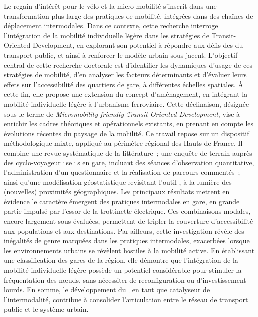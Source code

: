 {\footnotesize{Le regain d’intérêt pour le vélo et la micro-mobilité s’inscrit dans une transformation plus large des pratiques de mobilité, intégrées dans des chaînes de déplacement intermodales. Dans ce contexte, cette recherche interroge l’intégration de la mobilité individuelle légère dans les stratégies de Transit-Oriented Development, en explorant son potentiel à répondre aux défis des  du transport public, et ainsi à renforcer le modèle urbain sous-jacent. L’objectif central de cette recherche doctorale est d’identifier les dynamiques d’usage de ces stratégies de mobilité, d’en analyser les facteurs déterminants et d’évaluer leurs effets sur l’accessibilité des quartiers de gare, à différentes échelles spatiales. À cette fin, elle propose une extension du concept d’aménagement, en intégrant la mobilité individuelle légère à l'urbanisme ferroviaire. Cette déclinaison, désignée sous le terme de \textsl{Micromobility-friendly Transit-Oriented Development}, vise à enrichir les cadres théoriques et opérationnels existants, en prenant en compte les évolutions récentes du paysage de la mobilité. Ce travail repose sur un dispositif méthodologique mixte, appliqué au périmètre régional des Hauts-de-France. Il combine une revue systématique de la littérature~; une enquête de terrain auprès des cyclo-voyageur·se·s en gare, incluant des séances d’observation quantitative, l’administration d’un questionnaire et la réalisation de parcours commentés~; ainsi qu'une modélisation géostatistique revisitant l’outil , à la lumière des (nouvelles) proximités géographiques. Les principaux résultats mettent en évidence le caractère émergent des pratiques intermodales en gare, en grande partie impulsé par l’essor de la trottinette électrique. Ces combinaisons modales, encore largement sous-évaluées, permettent de tripler la couverture d’accessibilité aux populations et aux destinations. Par ailleurs, cette investigation révèle des inégalités de genre marquées dans les pratiques intermodales, exacerbées lorsque les environnements urbains se révèlent hostiles à la mobilité active. En établissant une classification des gares de la région, elle démontre que l’intégration de la mobilité individuelle légère possède un potentiel considérable pour stimuler la fréquentation des nœuds, sans nécessiter de reconfiguration ou d'investissement lourds. En somme, le développement du , en tant que catalyseur de l'intermodalité, contribue à consolider l'articulation entre le réseau de transport public et le système urbain.%
    }

}

